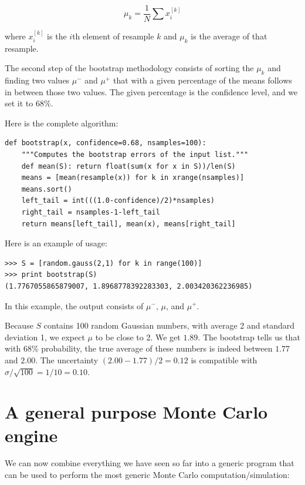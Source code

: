 \documentclass[justified,sixbynine]{tufte-book}
\def\ft{\small\tt}
\theoremstyle{plain}%
\theoremstyle{definition}
\theoremstyle{remark}
\begin{document}
\begin{fullwidth}
\begin{equation}
\mu_k = \frac1N \sum x^{[k]}_i
\end{equation}

where $x^{[k]}_i$ is the $i$th element of resample $k$ and $\mu_k$ is the average of that resample.

The second step of the bootstrap methodology consists of sorting the $\mu_k$ and finding two values $\mu^-$ and $\mu^+$ that with a given percentage of the means follows in between those two values. The given percentage is the confidence level, and we set it to $68\%$.

Here is the complete algorithm:

\begin{lstlisting}[caption={in file: {\ft nlib.py}}]
def bootstrap(x, confidence=0.68, nsamples=100):
    """Computes the bootstrap errors of the input list."""
    def mean(S): return float(sum(x for x in S))/len(S)
    means = [mean(resample(x)) for k in xrange(nsamples)]
    means.sort()
    left_tail = int(((1.0-confidence)/2)*nsamples)
    right_tail = nsamples-1-left_tail
    return means[left_tail], mean(x), means[right_tail]
\end{lstlisting}

Here is an example of usage:

\begin{lstlisting}
>>> S = [random.gauss(2,1) for k in range(100)]
>>> print bootstrap(S)
(1.7767055865879007, 1.8968778392283303, 2.003420362236985)
\end{lstlisting}

In this example, the output consists of $\mu^-$, $\mu$, and $\mu^+$.

Because $S$ contains 100 random Gaussian numbers, with average 2 and standard deviation 1, we expect $\mu$ to be close to 2. We get $1.89$. The bootstrap tells us that with 68\% probability, the true average of these numbers is indeed between $1.77$ and $2.00$. The uncertainty $(2.00-1.77)/2 = 0.12$ is compatible with $\sigma/\sqrt{100} = 1/10 = 0.10$.

\goodbreak\section{A general purpose Monte Carlo engine}

We can now combine everything we have seen so far into a generic program that can be used to perform the most generic Monte Carlo computation/simulation:


\end{fullwidth}
\end{document}
